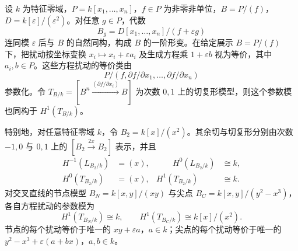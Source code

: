 \begin{proposition}[超曲面的方程扰动]\label{b3:prop:hypersurface-first-order-perturbation}\label{b3:prop:dual-numbers-cotangent-model}\label{b3:prop:node-first-order-deformation}
	设 \(k\) 为特征零域，\(P=k[x_1,\ldots,x_n]\)，\(f\in P\) 为非零非单位，\(B=P/(f)\)，\(D=k[\varepsilon]/(\varepsilon^2)\)。对任意 \(g\in P\)，代数
	\[
		B_g=D[x_1,\ldots,x_n]/(f+\varepsilon g)
	\]
	连同模 \(\varepsilon\) 后与 \(B\) 的自然同构，构成 \(B\) 的一阶形变。在给定展示 \(B=P/(f)\) 下，把扰动按坐标变换 \(x_i\mapsto x_i+\varepsilon a_i\) 及生成方程乘 \(1+\varepsilon b\) 视为等价，其中 \(a_i,b\in P\)。这些方程扰动的等价类由
	\[
		P/(f,\partial f/\partial x_1,\ldots,\partial f/\partial x_n)
	\]
	参数化。令 \(T_{B/k}=[B^n\xrightarrow{(\partial f/\partial x_i)}B]\) 为次数 \(0,1\) 上的切复形模型，则这个参数模也同构于 \(H^1(T_{B/k})\)。

	特别地，对任意特征零域 \(k\)，令 \(B_2=k[x]/(x^2)\)。其余切与切复形分别由次数 \(-1,0\) 与 \(0,1\) 上的 \([B_2\xrightarrow{2x}B_2]\) 表示，并且
	\[
		\begin{aligned}
			H^{-1}(L_{B_2/k})&=(x),&\qquad H^0(L_{B_2/k})&\cong k,\\
			H^0(T_{B_2/k})&=(x),& H^1(T_{B_2/k})&\cong k.
		\end{aligned}
	\]
	对交叉直线的节点模型 \(B_N=k[x,y]/(xy)\) 与尖点 \(B_C=k[x,y]/(y^2-x^3)\)，各自方程扰动的参数模为
	\[
		H^1(T_{B_N/k})\cong k,\qquad H^1(T_{B_C/k})\cong k[x]/(x^2).
	\]
	节点的每个扰动等价于唯一的 \(xy+\varepsilon a\)，\(a\in k\)；尖点的每个扰动等价于唯一的 \(y^2-x^3+\varepsilon(a+bx)\)，\(a,b\in k\)。
\end{proposition}
